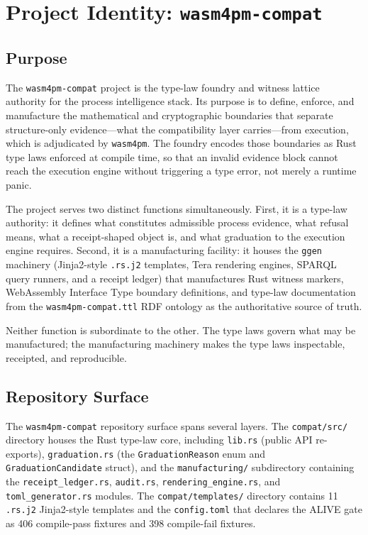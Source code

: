 
\section{Project Identity: \texttt{wasm4pm-compat}}
\label{sec:sources-wasm4pm-compat-identity}

\subsection{Purpose}
\label{sec:sources-wasm4pm-compat-identity-purpose}

The \texttt{wasm4pm-compat} project is the type-law foundry and witness lattice
authority for the process intelligence stack. Its purpose is to define, enforce, and
manufacture the mathematical and cryptographic boundaries that separate structure-only
evidence---what the compatibility layer carries---from execution, which is adjudicated
by \texttt{wasm4pm}. The foundry encodes those boundaries as Rust type laws enforced
at compile time, so that an invalid evidence block cannot reach the execution engine
without triggering a type error, not merely a runtime panic.

The project serves two distinct functions simultaneously. First, it is a type-law
authority: it defines what constitutes admissible process evidence, what refusal means,
what a receipt-shaped object is, and what graduation to the execution engine requires.
Second, it is a manufacturing facility: it houses the \texttt{ggen} machinery (Jinja2-style
\texttt{.rs.j2} templates, Tera rendering engines, SPARQL query runners, and a receipt
ledger) that manufactures Rust witness markers, WebAssembly Interface Type boundary
definitions, and type-law documentation from the \texttt{wasm4pm-compat.ttl} RDF
ontology as the authoritative source of truth.

Neither function is subordinate to the other. The type laws govern what may be manufactured;
the manufacturing machinery makes the type laws inspectable, receipted, and reproducible.

\subsection{Repository Surface}
\label{sec:sources-wasm4pm-compat-identity-surface}

The \texttt{wasm4pm-compat} repository surface spans several layers. The \texttt{compat/src/}
directory houses the Rust type-law core, including \texttt{lib.rs} (public API re-exports),
\texttt{graduation.rs} (the \texttt{GraduationReason} enum and \texttt{GraduationCandidate}
struct), and the \texttt{manufacturing/} subdirectory containing the \texttt{receipt\_ledger.rs},
\texttt{audit.rs}, \texttt{rendering\_engine.rs}, and \texttt{toml\_generator.rs} modules.
The \texttt{compat/templates/} directory contains 11 \texttt{.rs.j2} Jinja2-style templates
and the \texttt{config.toml} that declares the ALIVE gate as 406 compile-pass fixtures
and 398 compile-fail fixtures.

